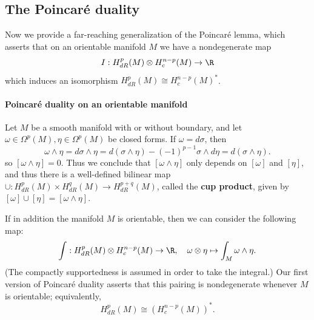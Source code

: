 \subsection{The Poincar\'e duality}
Now we provide a far-reaching generalization of the Poincar\'e lemma, which asserts that on an orientable manifold $M$ we have a nondegenerate map
\[I:H^p_{dR}(M)\otimes H^{n-p}_c(M)\to\R\]
which induces an isomorphism $H^p_{dR}(M)\cong H^{n-p}_c(M)^*$.
\paragraph{Poincar\'e duality on an orientable manifold}
Let $M$ be a smooth manifold with or without boundary, and let $\omega\in\Omega^p(M),\eta\in\Omega^p(M)$ be closed forms. If $\omega=d\sigma$, then
\[\omega\wedge\eta= d\sigma\wedge\eta=d(\sigma\wedge\eta)-(-1)^{p-1}\sigma\wedge d\eta=d(\sigma\wedge\eta).\]
so $[\omega\wedge\eta]=0$. Thus we conclude that $[\omega\wedge\eta]$ only depends on $[\omega]$ and $[\eta]$, and thus there is a well-defined bilinear map 
$\cup:H^p_{dR}(M)\times H^q_{dR}(M)\to H_{dR}^{p+q}(M)$, called the \textbf{cup product}, given by $[\omega]\cup[\eta]=[\omega\wedge\eta]$.\par
If in addition the manifold $M$ is orientable, then we can consider the following map:
\[\int:H^p_{dR}(M)\otimes H^{n-p}_c(M)\to\R,\quad \omega\otimes\eta\mapsto\int_M\omega\wedge\eta.\]
(The compactly supportedness is assumed in order to take the integral.) Our first version of Poincar\'e duality asserts that this pairing is nondegenerate whenever $M$ 
is orientable; equivalently,
\[H^p_{dR}(M)\cong(H_c^{n-p}(M))^*.\]

